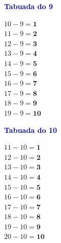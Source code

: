 \documentclass[12pt]{article}
\begin{document}
\begin{minipage}[t]{3.3cm}
\noindent\textcolor{darkblue}{\bfseries\small Tabuada do 9}\par\vspace{2pt}
{\footnotesize
$10-9=\mathbf{1}$\\$11-9=\mathbf{2}$\\$12-9=\mathbf{3}$\\
$13-9=\mathbf{4}$\\$14-9=\mathbf{5}$\\$15-9=\mathbf{6}$\\
$16-9=\mathbf{7}$\\$17-9=\mathbf{8}$\\$18-9=\mathbf{9}$\\
$19-9=\mathbf{10}$}
\end{minipage}\hfill
\begin{minipage}[t]{3.3cm}
\noindent\textcolor{darkblue}{\bfseries\small Tabuada do 10}\par\vspace{2pt}
{\footnotesize
$11-10=\mathbf{1}$\\$12-10=\mathbf{2}$\\$13-10=\mathbf{3}$\\
$14-10=\mathbf{4}$\\$15-10=\mathbf{5}$\\$16-10=\mathbf{6}$\\
$17-10=\mathbf{7}$\\$18-10=\mathbf{8}$\\$19-10=\mathbf{9}$\\
$20-10=\mathbf{10}$}
\end{minipage}
\end{document}
